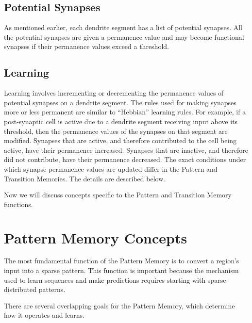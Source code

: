 \subsection*{Potential Synapses}
As mentioned earlier, each dendrite segment has a list of potential synapses. 
All the potential synapses are given a permanence value and may become functional synapses if their permanence values exceed a threshold.

\subsection*{Learning}
Learning involves incrementing or decrementing the permanence values
of potential synapses on a dendrite segment. The rules used for making
synapses more or less permanent are similar to ``Hebbian'' learning
rules. For example, if a post-synaptic cell is active due to a
dendrite segment receiving input above its threshold, then the
permanence values of the synapses on that segment are
modified. Synapses that are active, and therefore contributed to the
cell being active, have their permanence increased. Synapses that are
inactive, and therefore did not contribute, have their permanence
decreased. The exact conditions under which synapse permanence values
are updated differ in the Pattern and Transition Memories. The details are
described below.

Now we will discuss concepts specific to the Pattern and Transition Memory functions.

\section*{Pattern Memory Concepts}

The most fundamental function of the Pattern Memory is to convert a
region's input into a sparse pattern. This function is important
because the mechanism used to learn sequences and make predictions
requires starting with sparse distributed patterns.

There are several overlapping goals for the Pattern Memory, which
determine how it operates and learns.

